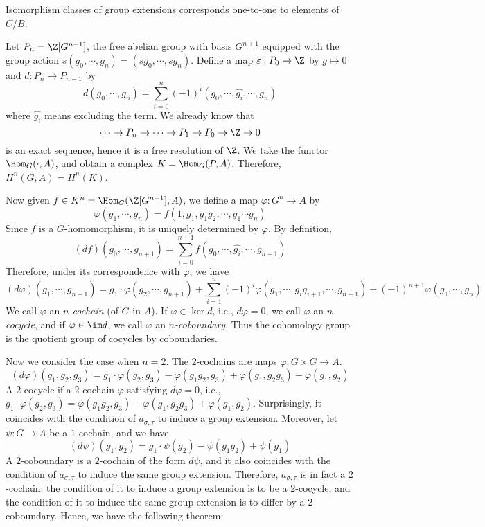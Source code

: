 \begin{proposition}
    Isomorphism classes of group extensions corresponds one-to-one to elements of $C/B$.
\end{proposition}

\begin{analysis}
    Let $P_n=\Z[G^{n+1}]$, the free abelian group with basis $G^{n+1}$ equipped with the group action $s(g_0,\cdots,g_n)=(sg_0,\cdots,sg_n)$. Define a map $\varepsilon:P_0\to\Z$ by $g\mapsto0$ and $d:P_n\to P_{n-1}$ by \[ d(g_0,\cdots,g_n)=\sum_{i=0}^n{(-1)^i(g_0,\cdots,\hat{g_i},\cdots,g_n)} \] where $\hat{g_i}$ means excluding the term. We already know that \[ \cdots\to P_n\to\cdots\to P_1\to P_0\to\Z\to0\] is an exact sequence, hence it is a free resolution of $\Z$. We take the functor $\Hom_G(\cdot,A)$, and obtain a complex $K=\Hom_G(P,A)$. Therefore, $H^n(G,A)=H^n(K)$.

    Now given $f\in K^n=\Hom_G(\Z[G^{n+1}],A)$, we define a map $\varphi:G^n\to A$ by \[ \varphi(g_1,\cdots,g_n)=f(1,g_1,g_1g_2,\cdots,g_1\cdots g_n) \] Since $f$ is a $G$-homomorphism, it is uniquely determined by $\varphi$. By definition, \[ (df)(g_0,\cdots,g_{n+1})=\sum_{i=0}^{n+1}{f(g_0,\cdots,\hat{g_i},\cdots,g_{n+1})} \] Therefore, under its correspondence with $\varphi$, we have \[ (d\varphi)(g_1,\cdots,g_{n+1})=g_1\cdot\varphi(g_2,\cdots,g_{n+1})+\sum_{i=1}^n{(-1)^i\varphi(g_1,\cdots,g_ig_{i+1},\cdots,g_{n+1})}+(-1)^{n+1}\varphi(g_1,\cdots,g_n) \] We call $\varphi$ an \emph{$n$-cochain} (of $G$ in $A$). If $\varphi\in\ker d$, i.e., $d\varphi=0$, we call $\varphi$ an \emph{$n$-cocycle}, and if $\varphi\in\im d$, we call $\varphi$ an \emph{$n$-coboundary}. Thus the cohomology group is the quotient group of cocycles by coboundaries.

    Now we consider the case when $n=2$. The $2$-cochains are maps $\varphi:G\times G\to A$. \[ (d\varphi)(g_1,g_2,g_3)=g_1\cdot\varphi(g_2,g_3)-\varphi(g_1g_2,g_3)+\varphi(g_1,g_2g_3)-\varphi(g_1,g_2) \] A $2$-cocycle if a $2$-cochain $\varphi$ satisfying $d\varphi=0$, i.e., $g_1\cdot\varphi(g_2,g_3)=\varphi(g_1g_2,g_3)-\varphi(g_1,g_2g_3)+\varphi(g_1,g_2)$. Surprisingly, it coincides with the condition of $a_{\sigma,\tau}$ to induce a group extension. Moreover, let $\psi:G\to A$ be a $1$-cochain, and we have $$ (d\psi)(g_1,g_2)=g_1\cdot\psi(g_2)-\psi(g_1g_2)+\psi(g_1) $$ A $2$-coboundary is a $2$-cochain of the form $d\psi$, and it also coincides with the condition of $a_{\sigma,\tau}$ to induce the same group extension. Therefore, $a_{\sigma,\tau}$ is in fact a $2$-cochain: the condition of it to induce a group extension is to be a $2$-cocycle, and the condition of it to induce the same group extension is to differ by a $2$-coboundary. Hence, we have the following theorem:
\end{analysis}

